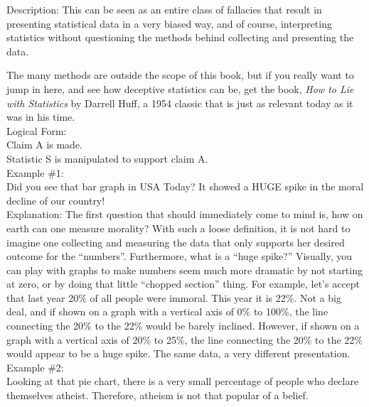 \documentclass[a4paper,12pt,single,pdftex]{scrbook}
\begin{document}
  
    Description: This can be seen as an entire class of fallacies that result in presenting statistical data in a very biased way, and of course, interpreting statistics without questioning the methods behind collecting and presenting the data.

    
      The many methods are outside the scope of this book, but if you really want to jump in here, and see how deceptive statistics can be, get the book, {\it How to Lie with Statistics} by Darrell Huff, a 1954 classic that is just as relevant today as it was in his time.
    \\

    
      Logical Form:
    \\

    
      Claim A is made.
    \\

    
      Statistic S is manipulated to support claim A.
    \\

    
      Example \#1:
    \\

    
      Did you see that bar graph in USA Today?  It showed a HUGE spike in the moral decline of our country!
    \\

    
      Explanation: The first question that should immediately come to mind is, how on earth can one measure morality?  With such a loose definition, it is not hard to imagine one collecting and measuring the data that only supports her desired outcome for the “numbers”.  Furthermore, what is a “huge spike?”  Visually, you can play with graphs to make numbers seem much more dramatic by not starting at zero, or by doing that little “chopped section” thing.  For example, let’s accept that last year 20\% of all people were immoral.  This year it is 22\%.  Not a big deal, and if shown on a graph with a vertical axis of 0\% to 100\%, the line connecting the 20\% to the 22\% would be barely inclined.  However, if shown on a graph with a vertical axis of 20\% to 25\%, the line connecting the 20\% to the 22\% would appear to be a huge spike. The same data, a very different presentation.
    \\

    
      Example \#2:
    \\

    
      Looking at that pie chart, there is a very small percentage of people who declare themselves atheist.  Therefore, atheism is not that popular of a belief.
    \\
\end{document}
